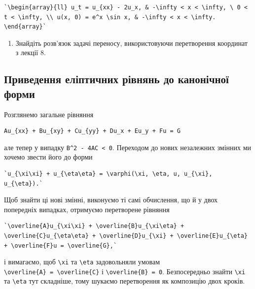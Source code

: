\documentclass[
  ukrainian,
]{article}
\providecommand{\tightlist}{%
  \setlength{\itemsep}{0pt}\setlength{\parskip}{0pt}}
\begin{document}
\begin{verbatim}
`\begin{array}{ll} u_t = u_{xx} - 2u_x, & -\infty < x < \infty, \ 0 < t < \infty, \\ u(x, 0) = e^x \sin x, & -\infty < x < \infty. \end{array}`
\end{verbatim}

\begin{enumerate}
\def\labelenumi{\arabic{enumi}.}
\setcounter{enumi}{2}
\tightlist
\item
  Знайдіть розв'язок задачі переносу, використовуючи перетворення
  координат з лекції 8.
\end{enumerate}

\subsection{Приведення еліптичних рівнянь до канонічної
форми}\label{ux43fux440ux438ux432ux435ux434ux435ux43dux43dux44f-ux435ux43bux456ux43fux442ux438ux447ux43dux438ux445-ux440ux456ux432ux43dux44fux43dux44c-ux434ux43e-ux43aux430ux43dux43eux43dux456ux447ux43dux43eux457-ux444ux43eux440ux43cux438}

Розглянемо загальне рівняння

\begin{verbatim}
Au_{xx} + Bu_{xy} + Cu_{yy} + Du_x + Eu_y + Fu = G
\end{verbatim}

але тепер у випадку \texttt{B\^{}2\ -\ 4AC\ \textless{}\ 0}. Переходом
до нових незалежних змінних ми хочемо звести його до форми

\begin{verbatim}
`u_{\xi\xi} + u_{\eta\eta} = \varphi(\xi, \eta, u, u_{\xi}, u_{\eta}).`
\end{verbatim}

Щоб знайти ці нові змінні, виконуємо ті самі обчислення, що й у двох
попередніх випадках, отримуємо перетворене рівняння

\begin{verbatim}
`\overline{A}u_{\xi\xi} + \overline{B}u_{\xi\eta} + \overline{C}u_{\eta\eta} + \overline{D}u_{\xi} + \overline{E}u_{\eta} + \overline{F}u = \overline{G},`
\end{verbatim}

і вимагаємо, щоб \texttt{\textbackslash{}xi} та
\texttt{\textbackslash{}eta} задовольняли умовам
\texttt{\textbackslash{}overline\{A\}\ =\ \textbackslash{}overline\{C\}}
і \texttt{\textbackslash{}overline\{B\}\ =\ 0}. Безпосередньо знайти
\texttt{\textbackslash{}xi} та \texttt{\textbackslash{}eta} тут
складніше, тому шукаємо перетворення як композицію двох кроків.
\end{document}
